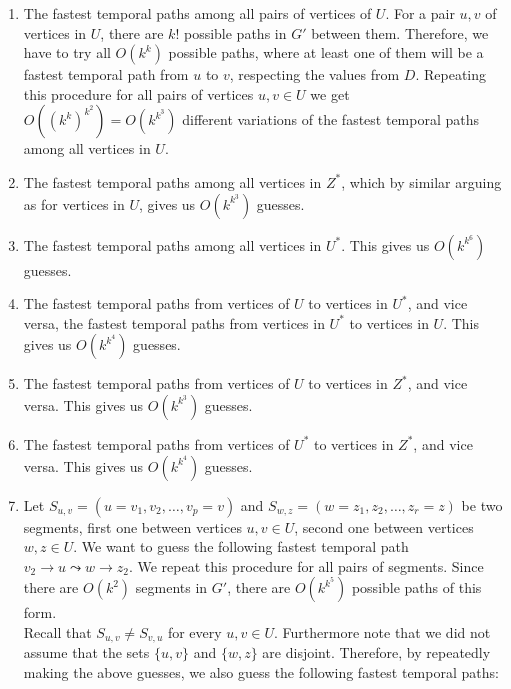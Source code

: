 \documentclass[a4paper,UKenglish,cleveref, autoref, thm-restate]{lipics-v2021}
\newcommand{\deltaExact}{\textsc{Periodic TGR}}
\begin{document}
\begin{enumerate}[G-1.]
    \item \label{FPT-guessFTPamongU}
    The fastest temporal paths among all pairs of vertices of $U$.
    For a pair $u,v$ of vertices in $U$, there are $k!$ possible paths in $G'$ between them. 
    Therefore, we have to try all $O(k^k)$ possible paths, where at least one of them will be a fastest temporal path from $u$ to $v$, respecting the values from $D$.
    Repeating this procedure for all pairs of vertices $u,v \in U$ we get $O((k^k)^{k^2})=O(k^{k^3})$ different variations of the fastest temporal paths among all vertices in $U$.
    \item \label{FPT-guessFTPamongZstar}
    The fastest temporal paths among all vertices in $Z^*$, 
    which by similar arguing as for vertices in $U$, gives us $O(k^{k^3})$ guesses.
    \item \label{FPT-guessFTPamongUstar}
    The fastest temporal paths among all vertices in $U^*$.
    This gives us $O(k^{k^6})$ guesses.
    \item \label{FPT-guessFTPamongUandUstar}
    The fastest temporal paths from vertices of $U$ to vertices in $U^*$,
    and vice versa, the fastest temporal paths from vertices in $U^*$ to vertices in $U$.
    This gives us $O(k^{k^4})$ guesses.
    \item \label{FPT-guessFTPamongUandZstar}
    The fastest temporal paths from vertices of $U$ to vertices in $Z^*$,
    and vice versa.
    This gives us $O(k^{k^3})$ guesses.
    \item \label{FPT-guessFTPamongUstarandZstar}
    The fastest temporal paths from vertices of $U^*$ to vertices in $Z^*$,
    and vice versa.
    This gives us $O(k^{k^4})$ guesses.
    \item \label{FPT-guessFTPamongv2z2}
    Let $S_{u,v} = (u=v_1,v_2, \dots, v_p = v)$ and $S_{w,z} = (w=z_1,z_2, \dots, z_r = z)$ be two segments,
    first one between vertices $u,v \in U$, second one between vertices $w, z \in U$.
    We want to guess the following fastest temporal path
    $v_2 \rightarrow u \leadsto w \rightarrow z_2$. 
    We repeat this procedure for all pairs of segments.
    Since there are $O(k^2)$ segments in $G'$,
    there are $O(k^{k^5})$ possible paths of this form. \\
    Recall that $S_{u,v}\neq S_{v,u}$ for every $u,v\in U$. Furthermore note that we did not assume that the sets $\{u,v\}$ and $\{w,z\}$ are disjoint. Therefore, by repeatedly making the above guesses, we also guess the following fastest temporal paths: 

\end{enumerate}
\end{document}
